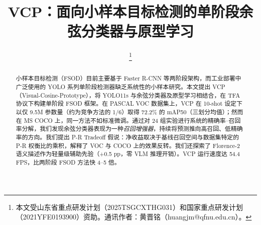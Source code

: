 \documentclass[conference]{IEEEtran}
\begin{document}
\title{VCP：面向小样本目标检测的单阶段余弦分类器与原型学习}

\author{
\and
{}
\and
{}
\and
{}
\and
{}
\and
{}
\thanks{本文受山东省重点研发计划（2025TSGCXTHG031）和国家重点研发计划（2021YFE0193900）资助。通讯作者：黄晋铭（huangjm@qfnu.edu.cn）。}
}

\maketitle

\begin{abstract}
小样本目标检测（FSOD）目前主要基于 Faster R-CNN 等两阶段架构，而工业部署中广泛使用的 YOLO 系列单阶段检测器缺乏系统性的小样本研究。本文提出 VCP（Visual-Cosine-Prototype），将 YOLO11s 与余弦分类器及原型学习相结合，在 TFA 协议下构建单阶段 FSOD 框架。在 PASCAL VOC 数据集上，VCP 在 10-shot 设定下以仅 9.5M 参数量（约为竞争方法的 1/6）取得 72.2\% 的 mAP50（三划分均值）；然而在 MS COCO 上，同一方法不如标准微调。通过对 24 组实验进行系统的精确率--召回率分解，我们发现余弦分类器表现为一种\textit{召回增强器}，持续将预测推向高召回、低精确率的方向。我们提出 P-R Tradeoff 假说：净收益取决于基线召回空间与数据集特定的 P-R 权衡比的乘积，解释了 VOC 与 COCO 上的效果反转。我们还探索了 Florence-2 语义描述作为轻量级辅助先验（+0.5 pp，零 VLM 推理开销）。VCP 运行速度达 54.4 FPS，比两阶段 FSOD 方法快 4--5 倍。
\end{abstract}
\end{document}
